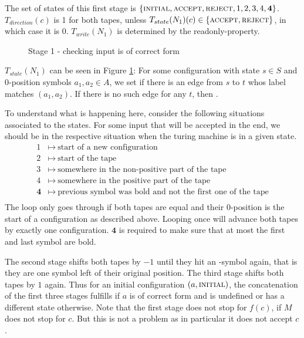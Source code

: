 	The set of states of this first stage is $\{\text{\scshape{initial}},\text{\scshape{accept}},\text{\scshape{reject}},1,2,3,4,\textbf{4}\}$.
	$T_{direction}(c)$ is 1 for both tapes, unless $T_{state}(N_1)(c) \in \{\text{\scshape{accept}},\text{\scshape{reject}}\}$, in which case it is 0. $T_{write}(N_1)$ is determined by the readonly-property.
	
	\begin{figure}
		\centering
		
		\caption{Stage 1 - checking input is of correct form}
		\label{turing_machines:main_theorem:fig_stage1}
	\end{figure}

	$T_{state}(N_1)$ can be seen in Figure \ref{turing_machines:main_theorem:fig_stage1}:
	For some configuration with state $s \in S$ and $0$-position symbols $a_1,a_2 \in A$, we set  if there is an edge from $s$ to $t$ whos label matches $(a_1,a_2)$.
	If there is no such edge for any $t$, then .

	To understand what is happening here, consider the following situations associated to the states.
	For some input that will be accepted in the end, we should be in the respective situation when the turing machine is in a given state.
	\begin{align*}
		1 &\mapsto~\text{start of a new configuration} \\
		2 &\mapsto~\text{start of the tape} \\
		3 &\mapsto~\text{somewhere in the non-positive part of the tape} \\
		4 &\mapsto~\text{somewhere in the positive part of the tape} \\
		\textbf{4} &\mapsto~\text{previous symbol was bold and not the first one of the tape} \\
	\end{align*}
	The loop  only goes through if both tapes are equal and their $0$-position is the start of a configuration as described above.
	Looping once will advance both tapes by exactly one configuration.
	$\textbf{4}$ is required to make sure that at most the first and last symbol are bold.

	The second stage shifts both tapes by $-1$ until they hit an \EMP-symbol again, that is they are one symbol left of their original position.
	The third stage shifts both tapes by $1$ again.
	Thus for an initial configuration $(a,\text{\scshape{initial}})$, the concatenation of the first three stages fulfills  if $a$ is of correct form and is undefined or has a different state otherwise.
	Note that the first stage does not stop for $f(c)$, if $M$ does not stop for $c$. But this is not a problem as in particular it does not accept $c$.

